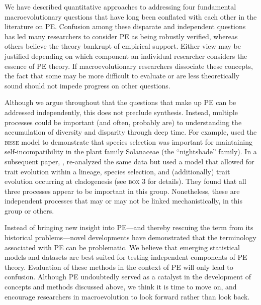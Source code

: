 We have described quantitative approaches to addressing four fundamental macroevolutionary questions that have long been conflated with each other in the literature on PE. Confusion among these disparate and independent questions has led many researchers to consider PE as being robustly verified, whereas others believe the theory bankrupt of empirical support. Either view may be justified depending on which component an individual researcher considers the essence of PE theory. If macroevolutionary researchers dissociate these concepts, the fact that some may be more difficult to evaluate or are less theoretically sound should not impede progress on other questions.

Although we argue throughout that the questions that make up PE can be addressed independently, this does not preclude synthesis. Instead, multiple processes could be important (and often, probably are) to understanding the accumulation of diversity and disparity through deep time. For example, \citet{Goldberg2010} used the \textsc{bisse} model to demonstrate that species selection was important for maintaining self-incompatibility in the plant family Solanaceae (the ``nightshade'' family). In a subsequent paper, \citet{Goldberg2012}, re-analyzed the same data but used a model that allowed for trait evolution within a lineage, species selection, and (additionally) trait evolution occurring at cladogenesis (see \textsc{box 3} for details). They found that all three processes appear to be important in this group. Nonetheless, these are independent processes that may or may not be linked mechanistically, in this group or others.

Instead of bringing new insight into PE---and thereby rescuing the term from its historical problems---novel developments have demonstrated that the terminology associated with PE can be problematic. We believe that emerging statistical models and datasets are best suited for testing independent components of PE theory. Evaluation of these methods in the context of PE will only lead to confusion. Although PE undoubtedly served as a catalyst in the development of concepts and methods discussed above, we think it is time to move on, and encourage researchers in macroevolution to look forward rather than look back. 

